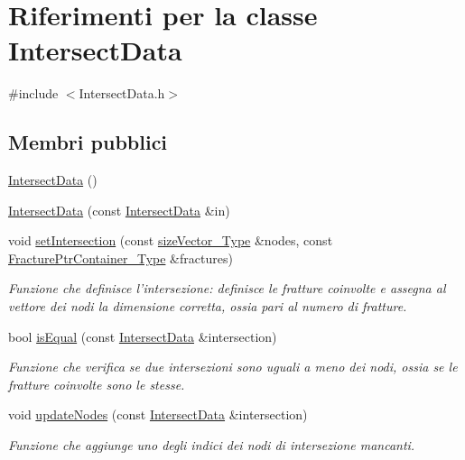 \hypertarget{classIntersectData}{\section{Riferimenti per la classe Intersect\-Data}
\label{classIntersectData}
}


{\ttfamily \#include $<$Intersect\-Data.\-h$>$}

\subsection*{Membri pubblici}
\begin{DoxyCompactItemize}
\item 
\hyperlink{classIntersectData_ac86ac869672ccd193327ce246e7969d6}{Intersect\-Data} ()
\item 
\hyperlink{classIntersectData_a731a27ad828cdc8146679a292cbd4582}{Intersect\-Data} (const \hyperlink{classIntersectData}{Intersect\-Data} \&in)
\item 
void \hyperlink{classIntersectData_a4dbe681fa68704c9e2bf3f8e290b55f7}{set\-Intersection} (const \hyperlink{Core_8h_a83c51913d041a5001e8683434c09857f}{size\-Vector\-\_\-\-Type} \&nodes, const \hyperlink{FractureHandler_8h_a2f0b57e18ecf89912d7de0c87158009e}{Fracture\-Ptr\-Container\-\_\-\-Type} \&fractures)
\begin{DoxyCompactList}\small\item\em Funzione che definisce l'intersezione\-: definisce le fratture coinvolte e assegna al vettore dei nodi la dimensione corretta, ossia pari al numero di fratture. \end{DoxyCompactList}\item 
bool \hyperlink{classIntersectData_acbb362d913af755b71fa801e3a507a63}{is\-Equal} (const \hyperlink{classIntersectData}{Intersect\-Data} \&intersection)
\begin{DoxyCompactList}\small\item\em Funzione che verifica se due intersezioni sono uguali a meno dei nodi, ossia se le fratture coinvolte sono le stesse. \end{DoxyCompactList}\item 
void \hyperlink{classIntersectData_a6bcd52066286893ea1f7c36ea841da82}{update\-Nodes} (const \hyperlink{classIntersectData}{Intersect\-Data} \&intersection)
\begin{DoxyCompactList}\small\item\em Funzione che aggiunge uno degli indici dei nodi di intersezione mancanti. \end{DoxyCompactList}\item 

\end{DoxyCompactItemize}
